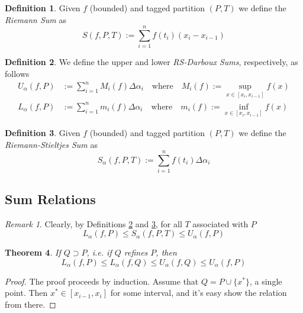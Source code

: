 \documentclass[12pt]{article}
\theoremstyle{plain}
\newtheorem{thm}{Theorem}[subsection]
\theoremstyle{definition}
\newtheorem{defn}[thm]{Definition}
\theoremstyle{remark}
\newtheorem*{rmk}{Remark}
\begin{document}
\begin{defn} Given $f$ (bounded) and tagged partition $(P,T)$ we define the \emph{Riemann Sum} as 
    \begin{equation}
        S(f,P,T) := \sum^n_{i=1} f(t_i) (x_i - x_{i-1})
    \end{equation}
\end{defn}

\begin{defn} 
\label{RSD}
We define the upper and lower \emph{RS-Darboux Sums}, respectively, as follows 
    \begin{align*}
        U_\alpha(f,P) &:= \sum^n_{i=1} M_i(f) \Delta \alpha_i
            \quad\text{where} \quad 
            M_i(f) := \sup_{x \in [x_i, x_{i-1}]} f(x) \\
        L_\alpha(f,P) &:= \sum^n_{i=1} m_i(f)\Delta \alpha_i
            \quad\text{where} \quad 
            m_i(f) := \inf_{x \in [x_i, x_{i-1}]} f(x) 
    \end{align*}
\end{defn}

\begin{defn} 
\label{RSS}
Given $f$ (bounded) and tagged partition $(P,T)$ we define the \emph{Riemann-Stieltjes Sum} as 
    \begin{equation}
        S_\alpha(f,P,T) := \sum^n_{i=1} f(t_i) \Delta \alpha_i
    \end{equation}
\end{defn}

\subsection{Sum Relations}

\begin{rmk} Clearly, by Definitions \ref{RSD} and \ref{RSS}, for all $T$ associated with $P$
    \[ L_\alpha(f,P) \leq S_\alpha(f,P,T) \leq U_\alpha(f,P) \]
\end{rmk}

\begin{thm} 
\label{sumineq}
    If $Q \supset P$, i.e. if $Q$ refines $P$, then
    \[ L_\alpha(f,P) \leq L_\alpha(f,Q) \leq U_\alpha(f,Q) 
        \leq U_\alpha(f,P) \]
\end{thm}
\begin{proof} The proof proceeds by induction. Assume that $Q = P \cup \{x^*\}$, a single point. Then $x^*\in [x_{i-1}, x_i]$ for some interval, and it's easy show the relation from there.
\end{proof}
\end{document}
